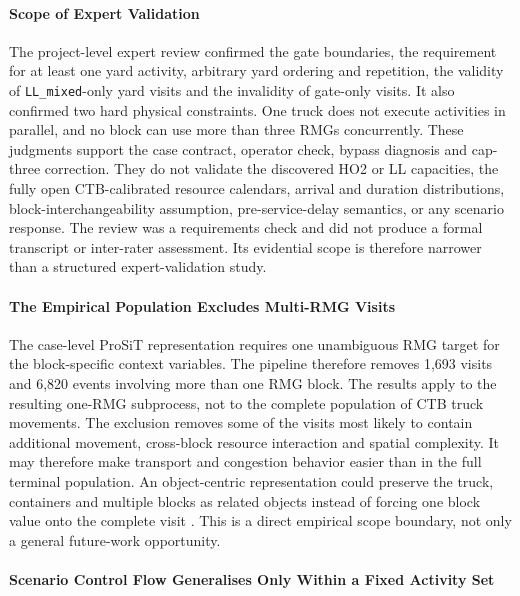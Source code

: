 \paragraph{Scope of Expert Validation}

The project-level expert review confirmed the gate boundaries, the requirement
for at least one yard activity, arbitrary yard ordering and repetition, the
validity of \texttt{LL\_mixed}-only yard visits and the invalidity of gate-only
visits. It also confirmed two hard physical constraints. One truck does not
execute activities in parallel, and no block can use more than three RMGs
concurrently. These judgments support the case contract, operator check,
bypass diagnosis and cap-three correction. They do not validate the discovered
HO2 or LL capacities, the fully open CTB-calibrated resource calendars, arrival and duration
distributions, block-interchangeability assumption, pre-service-delay
semantics, or any scenario response. The review was a requirements check and
did not produce a formal transcript or inter-rater assessment. Its evidential
scope is therefore narrower than a structured expert-validation study.

\paragraph{The Empirical Population Excludes Multi-RMG Visits}

The case-level ProSiT representation requires one unambiguous RMG target for
the block-specific context variables. The pipeline therefore removes 1,693
visits and 6,820 events involving more than one RMG block. The results apply to
the resulting one-RMG subprocess, not to the complete population of CTB truck
movements. The exclusion removes some of the visits most likely to contain
additional movement, cross-block resource interaction and spatial complexity.
It may therefore make transport and congestion behavior easier than in the
full terminal population. An object-centric representation could preserve the
truck, containers and multiple blocks as related objects instead of forcing one
block value onto the complete visit
\cite{VanDerAalst2023OCPM,Knopp2023ObjectCentricSimulation}. This is a direct
empirical scope boundary, not only a general future-work opportunity.

\paragraph{Scenario Control Flow Generalises Only Within a Fixed Activity Set}

